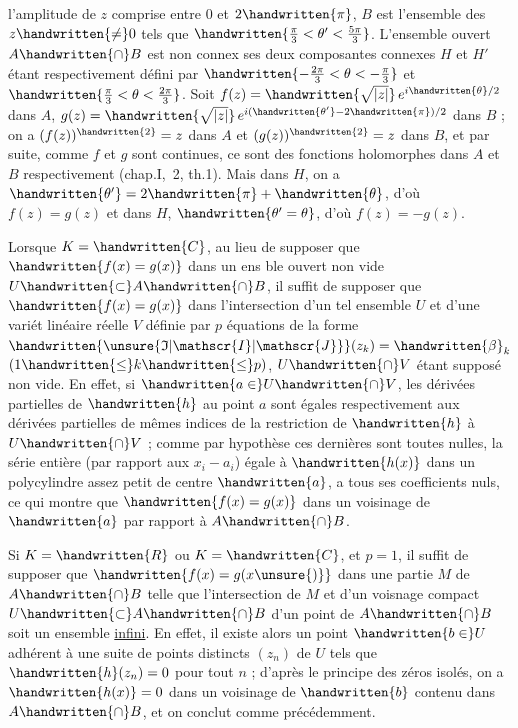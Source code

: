 l'amplitude de $z$ comprise entre $0$ et $2\handwritten{\pi}$, $B$ est l'ensemble des $z\handwritten{\neq}0$ tels que $\handwritten{\frac{\pi}{3}<\theta'<\frac{5\pi}{3}}$. L'ensemble ouvert $A\handwritten{\cap}B$ est non connex ses deux composantes connexes $H$ et $H'$ étant respectivement défini par $\handwritten{-\frac{2\pi}{3}<\theta<-\frac{\pi}{3}}$ et $\handwritten{\frac{\pi}{3}<\theta<\frac{2\pi}{3}}$. Soit $f(z)=\handwritten{\sqrt{|z|}}\,e^{i\handwritten{\theta}/2}$ dans $A$, $g(z)=\handwritten{\sqrt{|z|}}\,e^{i(\handwritten{\theta'}-2\handwritten{\pi})/2}$ dans $B$ ; on a $(f(z))^{\handwritten{2}}=z$ dans $A$ et $(g(z))^{\handwritten{2}}=z$ dans $B$, et par suite, comme $f$ et $g$ sont continues, ce sont des fonctions holomorphes dans $A$ et $B$ respectivement (chap.I, \handwritten{\S}\,2, th.1). Mais dans $H$, on a $\handwritten{\theta'}=2\handwritten{\pi}+\handwritten{\theta}$, d'où $f(z)=g(z)$ et dans $H$, $\handwritten{\theta'=\theta}$, d'où $f(z)=-g(z)$.

 Lorsque $K=\handwritten{C}$, au lieu de supposer que $\handwritten{f(x)=g(x)}$ dans un ens%
ble ouvert non vide $U\handwritten{\subset}A\handwritten{\cap}B$, il suffit de supposer que $\handwritten{f(x)=g(x)}$ dans l'intersection d'un tel ensemble $U$ et d'une variét linéaire réelle $V$ définie par $p$ équations de la forme $\handwritten{\unsure{\mathfrak{I}|\mathscr{I}|\mathscr{J}}}(z_k)=\handwritten{\beta}_k$ $(1\handwritten{\leq}k\handwritten{\leq}p)$, $U\handwritten{\cap}V$ étant supposé non vide. En effet, si $\handwritten{a\in}U\handwritten{\cap}V$, les dérivées partielles de $\handwritten{h}$ au point $a$ sont égales respectivement aux dérivées partielles de mêmes indices de la restriction de $\handwritten{h}$ à $U\handwritten{\cap}V$ ; comme par hypothèse ces dernières sont toutes nulles, la série entière (par rapport aux $x_i-a_i$) égale à $\handwritten{h(x)}$ dans un polycylindre assez petit de centre $\handwritten{a}$, a tous ses coefficients nuls, ce qui montre que $\handwritten{f(x)=g(x)}$ dans un voisina\handwritten{-}ge de $\handwritten{a}$ par rapport à $A\handwritten{\cap}B$.

Si $K=\handwritten{R}$ ou $K=\handwritten{C}$, et $p=1$, il suffit de supposer que $\handwritten{f(x)=g(x\unsure{)}}$ dans une partie $M$ de $A\handwritten{\cap}B$ telle que l'intersection de $M$ et d'un voisna\handwritten{-}ge compact $U\handwritten{\subset}A\handwritten{\cap}B$ d'un point de $A\handwritten{\cap}B$ soit un ensemble \uline{infini}. En effet, il existe alors un point $\handwritten{b\in}U$ adhérent à une suite de points distincts $(z_n)$ de $U$ tels que $\handwritten{h}(z_n)=0$ pour tout $n$ ; d'après le principe des zéros isolés, on a $\handwritten{h(x)}=0$ dans un voisinage de $\handwritten{b}$ contenu dans $A\handwritten{\cap}B$, et on conclut comme précédemment.
